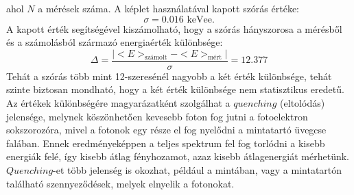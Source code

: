 \documentclass[12pt,a4paper]{article}
\begin{document}
ahol $N$ a mérések száma. A képlet használatával kapott szórás értéke: 
$$\sigma=0.016 \textrm{ keVee}.$$
A kapott érték segítségével kiszámolható, hogy a szórás hányszorosa a mérésből és a számolásból származó energiaérték különbsége:
\begin{equation}
\Delta=\frac{|<E>_{\textrm{számolt}}-<E>_{\textrm{mért}}|}{\sigma}=12.377
\end{equation}
Tehát a szórás több mint 12-szeresénél nagyobb a két érték különbsége, tehát szinte biztosan mondható, hogy a két érték különbsége nem statisztikus eredetű.\\
\hspace*{10pt} Az értékek különbségére magyarázatként szolgálhat a $quenching$ (eltolódás) jelensége, melynek köszönhetően kevesebb foton fog jutni a fotoelektron sokszorozóra, mivel a fotonok egy része el fog nyelődni a mintatartó üvegcse falában. Ennek eredményeképpen a teljes spektrum fel fog torlódni a kisebb energiák felé, így kisebb átlag fényhozamot, azaz kisebb átlagenergiát mérhetünk. $Quenching$-et több jelenség is okozhat, például a mintában, vagy a mintatartón található szennyeződések, melyek elnyelik a fotonokat.

\newpage
\end{document}
